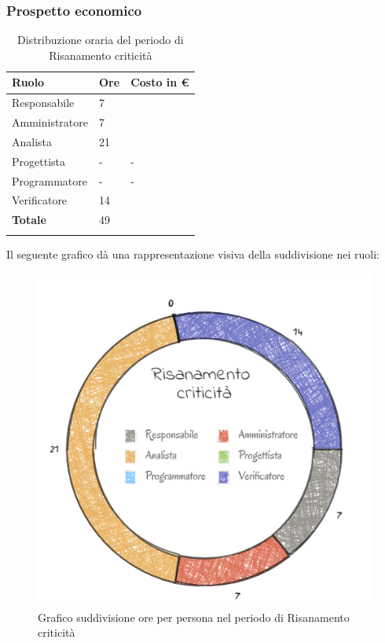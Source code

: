 \subsubsection{Prospetto economico}
\begin{longtable}{| C{.30\textwidth}| C{.15\textwidth}| C{.20\textwidth}|}
\hline
\textbf{Ruolo} & \textbf{Ore} & \textbf{Costo in \euro} \\
\hline 
Responsabile & 7 &  \\
\hline
Amministratore & 7 &  \\
\hline
Analista & 21 &  \\
\hline
Progettista & - & - \\
\hline
Programmatore & - & - \\
\hline
Verificatore & 14 & \\
\hline
\textbf{Totale} & 49 &  \\
\hline


\caption{Distribuzione oraria del periodo di Risanamento criticità}
\label{Distribuzione oraria del periodo di Risanamento criticità}
\end{longtable}

Il seguente grafico dà una rappresentazione visiva della suddivisione nei ruoli:
\begin{figure}[H]
	\centering
  		\includegraphics[width=0.8\linewidth]{./images/torta_rc1.png}
  		\caption{Grafico suddivisione ore per persona nel periodo di Risanamento criticità}
  		\label{fig:grafico suddivione ruoli periodo di Risanamento criticità}
\end{figure}


